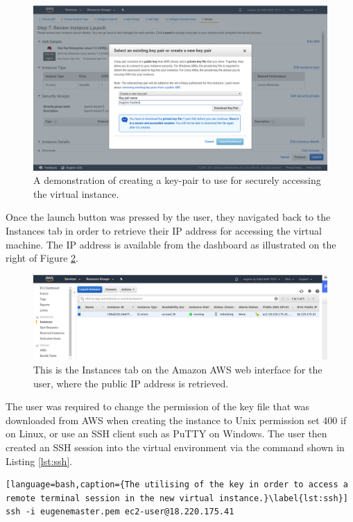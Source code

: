 \begin{figure}[h!]
\centering
\includegraphics[width=\textwidth]{Figures/4_aws_keypair.png}
\decoRule
\caption[AWS Keypair Creation]{A demonstration of creating a key-pair to use for securely accessing the virtual instance.}
\label{fig:aws_keypair}
\end{figure}

Once the launch button was pressed by the user, they navigated back to the Instances tab in order to retrieve their IP address for accessing the virtual machine. The IP address is available from the dashboard as illustrated on the right of Figure \ref{fig:aws_instancelist}. 

\begin{figure}[h!]
\centering
\includegraphics[width=\textwidth]{Figures/4_aws_instancelist.png}
\decoRule
\caption[AWS Instances View]{This is the Instances tab on the Amazon AWS web interface for the user, where the public IP address is retrieved.}
\label{fig:aws_instancelist}
\end{figure}

The user was required to change the permission of the key file that was downloaded from AWS when creating the instance to Unix permission set 400 if on Linux, or use an SSH client such as PuTTY on Windows. The user then created an SSH session into the virtual environment via the command shown in Listing \ref{lst:ssh}.

\begin{lstlisting}[language=bash,caption={The utilising of the key in order to access a remote terminal session in the new virtual instance.}\label{lst:ssh}]
ssh -i eugenemaster.pem ec2-user@18.220.175.41
\end{lstlisting}

